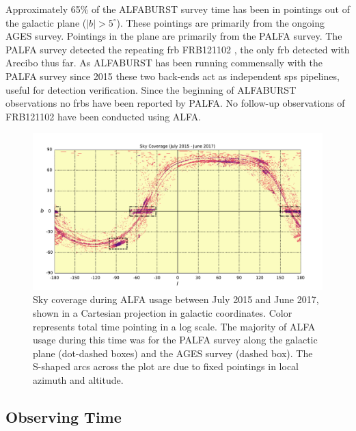 \documentclass[a4paper,fleqn,usenatbib]{mnras}
\begin{document}

Approximately 65\% of the ALFABURST survey time has been in pointings
out of the galactic plane ($|b| > 5^{\circ}$).  These pointings are
primarily from the ongoing AGES survey.  Pointings in the plane are
primarily from the PALFA survey.  The PALFA survey detected the
repeating \gls{frb} FRB121102 \citep{2014ApJ...790..101S}, the only
\gls{frb} detected with Arecibo thus far.  As ALFABURST has been
running commensally with the PALFA survey since 2015 these two
back-ends act as independent \gls{sps} pipelines, useful for detection
verification.  Since the beginning of ALFABURST observations no
\glspl{frb} have been reported by PALFA. No follow-up observations of
FRB121102 have been conducted using ALFA.

\begin{figure}
    \includegraphics[width=1.0\linewidth]{figures/cartview_sky_coverage.pdf}
    \caption{Sky coverage during ALFA usage between July 2015 and June 2017,
    shown in a Cartesian projection in galactic coordinates. Color represents
    total time pointing in a log scale. The majority of ALFA usage during this
    time was for the PALFA survey along the galactic plane (dot-dashed boxes)
    and the AGES survey (dashed box).  The S-shaped arcs across the plot are due
    to fixed pointings in local azimuth and altitude.
    }
    \label{fig:sky_coverage}
\end{figure}



\subsection{Observing Time}
\label{sec:obs_time}
\end{document}
